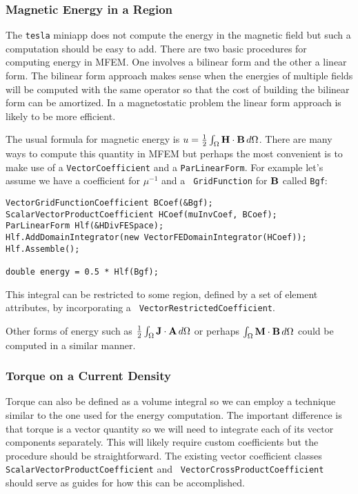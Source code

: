 \documentclass[12pt]{article}
\providecommand{\A}{\mbox{\bf A}}
\providecommand{\B}{\mbox{\bf B}}
\renewcommand{\H}{\mbox{\bf H}}
\providecommand{\J}{\mbox{\bf J}}
\providecommand{\M}{\mbox{\bf M}}
\begin{document}
\subsubsection{Magnetic Energy in a Region}

The {\tt tesla} miniapp does not compute the energy in the magnetic
field but such a computation should be easy to add. There are two
basic procedures for computing energy in MFEM. One involves a bilinear
form and the other a linear form. The bilinear form approach makes
sense when the energies of multiple fields will be computed with the
same operator so that the cost of building the bilinear form can be
amortized. In a magnetostatic problem the linear form approach is
likely to be more efficient.

The usual formula for magnetic energy is $u =
\frac{1}{2}\int_\Omega\H\cdot\B\,d\Omega$. There are many ways to
compute this quantity in MFEM but perhaps the most convenient is to
make use of a {\tt VectorCoefficient} and a {\tt ParLinearForm}. For
example let's assume we have a coefficient for $\mu^{-1}$ and a {\tt
  GridFunction} for $\B$ called {\tt Bgf}:
\begin{verbatim}
VectorGridFunctionCoefficient BCoef(&Bgf);
ScalarVectorProductCoefficient HCoef(muInvCoef, BCoef);
ParLinearForm Hlf(&HDivFESpace);
Hlf.AddDomainIntegrator(new VectorFEDomainIntegrator(HCoef));
Hlf.Assemble();

double energy = 0.5 * Hlf(Bgf);
\end{verbatim}
This integral can be restricted to some region, defined by a set of
element attributes, by incorporating a {\tt
  VectorRestrictedCoefficient}.

Other forms of energy such as
$\frac{1}{2}\int_\Omega\J\cdot\A\,d\Omega$ or perhaps
$\int_\Omega\M\cdot\B\,d\Omega$ could be computed in a similar manner.

\subsubsection{Torque on a Current Density}

Torque can also be defined as a volume integral so we can employ a
technique similar to the one used for the energy computation. The
important difference is that torque is a vector quantity so we will
need to integrate each of its vector components separately. This will
likely require custom coefficients but the procedure should be
straightforward. The existing vector coefficient classes {\tt
  ScalarVectorProductCoefficient} and {\tt
  VectorCrossProductCoefficient} should serve as guides for how this
can be accomplished.
\end{document}
